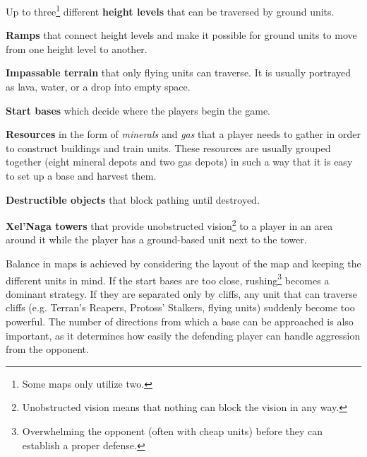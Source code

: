 \begin{my_itemize}

	\item Up to three\footnote{Some maps only utilize two.} different \textbf{height levels} that can be traversed by ground units.

	\item \textbf{Ramps} that connect height levels and make it possible for ground units to move from one height level to another.

	\item \textbf{Impassable terrain} that only flying units can traverse. It is usually portrayed as lava, water, or a drop into empty space.

	\item \textbf{Start bases} which decide where the players begin the game.

	\item \textbf{Resources} in the form of \textit{minerals} and \textit{gas} that a player needs to gather in order to construct buildings and train units. These resources are usually grouped together (eight mineral depots and two gas depots) in such a way that it is easy to set up a base and harvest them.

	\item \textbf{Destructible objects} that block pathing until destroyed.

	\item \textbf{Xel'Naga towers} that provide unobstructed vision\footnote{Unobstructed vision means that nothing can block the vision in any way.} to a player in an area around it while the player has a ground-based unit next to the tower.

\end{my_itemize}

Balance in maps is achieved by considering the layout of the map and keeping the different units in mind. If the start bases are too close, rushing\footnote{Overwhelming the opponent (often with cheap units) before they can establish a proper defense.} becomes a dominant strategy. If they are separated only by cliffs, any unit that can traverse cliffs (e.g. Terran's Reapers, Protoss' Stalkers, flying units) suddenly become too powerful. The number of directions from which a base can be approached is also important, as it determines how easily the defending player can handle aggression from the opponent.

